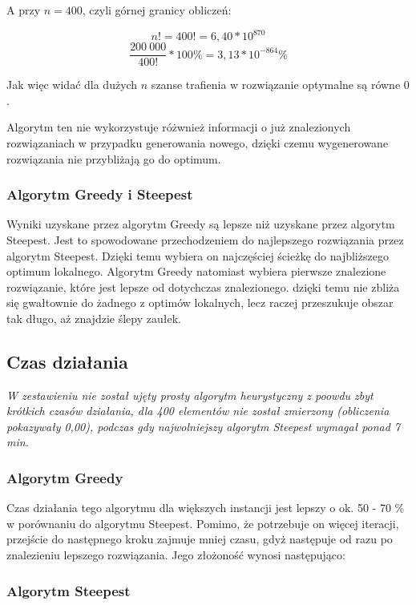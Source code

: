 A przy $ n = 400 $, czyli górnej granicy obliczeń:

$$ n! = 400! = 6,40 * 10^{870} $$
$$ \frac{200~000}{400!} * 100\% = 3,13 * 10^{-864}\%  $$

Jak więc widać dla dużych $ n $ szanse trafienia w rozwiązanie optymalne są równe $ 0 $.

Algorytm ten nie wykorzystuje różwnież informacji o już znalezionych rozwiązaniach 
w przypadku generowania nowego, dzięki czemu wygenerowane rozwiązania nie przybliżają
go do optimum.

\subsubsection{Algorytm Greedy i Steepest}

Wyniki uzyskane przez algorytm Greedy są lepsze niż uzyskane przez algorytm Steepest. 
Jest to spowodowane przechodzeniem do najlepszego rozwiązania przez algorytm Steepest. 
Dzięki temu wybiera on najczęściej ścieżkę do najbliższego optimum lokalnego. Algorytm
Greedy natomiast wybiera pierwsze znalezione rozwiązanie, które jest lepsze od dotychczas 
znalezionego. dzięki temu nie zbliża się gwałtownie do żadnego z optimów lokalnych, lecz 
raczej przeszukuje obszar tak długo, aż znajdzie ślepy zaułek.


\subsection{Czas działania}

\it
W zestawieniu nie został ujęty prosty algorytm heurystyczny z poowdu zbyt krótkich czasów 
działania, dla 400 elementów nie został zmierzony (obliczenia pokazywały 0,00), podczas 
gdy najwolniejszy algorytm Steepest wymagał ponad 7 min.
\rm

\subsubsection{Algorytm Greedy}

Czas działania tego algorytmu dla większych instancji jest lepszy o ok. 50 - 70 \% w porównaniu 
do algorytmu Steepest. Pomimo, że potrzebuje on więcej iteracji, przejście do następnego kroku 
zajmuje mniej czasu, gdyż następuje od razu po znalezieniu lepszego rozwiązania. Jego złożoność 
wynosi następująco:

\subsubsection{Algorytm Steepest}

